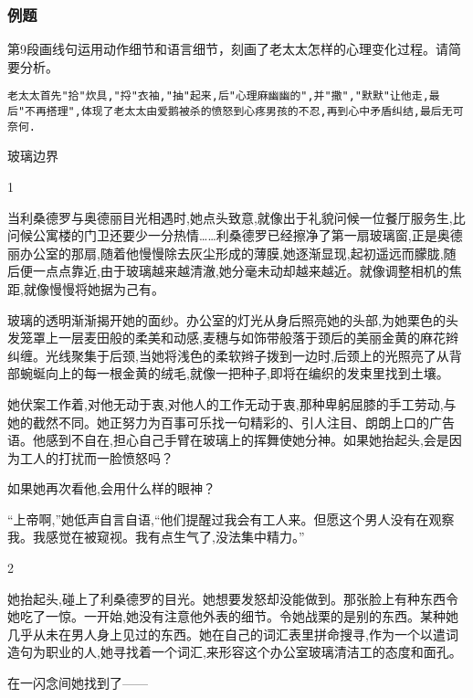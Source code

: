 \documentclass{ctexart}
\newcommand{\nm}{\normalsize}
\renewcommand{\\}{\par}
\begin{document}
\subsubsection{例题}
\\第9段画线句运用动作细节和语言细节，刻画了老太太怎样的心理变化过程。请简要分析。
\\ \texttt{老太太首先"拾"炊具,"捋"衣袖,"抽"起来,后"心理麻幽幽的",并"撒","默默"让他走,最后"不再搭理",体现了老太太由爱鹅被杀的愤怒到心疼男孩的不忍,再到心中矛盾纠结,最后无可奈何.}
\nm \fangsong 
\\\centerline{玻璃边界}
\\ \begin{center} 1 \end{center} \\当利桑德罗与奥德丽目光相遇时,她点头致意,就像出于礼貌问候一位餐厅服务生,比问候公寓楼的门卫还要少一分热情……利桑德罗已经擦净了第一扇玻璃窗,正是奥德丽办公室的那扇,随着他慢慢除去灰尘形成的薄膜,她逐渐显现,起初遥远而朦胧,随后便一点点靠近,由于玻璃越来越清澈,她分毫未动却越来越近。就像调整相机的焦距,就像慢慢将她据为己有。\\玻璃的透明渐渐揭开她的面纱。办公室的灯光从身后照亮她的头部,为她栗色的头发笼罩上一层麦田般的柔美和动感,麦穗与如饰带般落于颈后的美丽金黄的麻花辫纠缠。光线聚集于后颈,当她将浅色的柔软辫子拨到一边时,后颈上的光照亮了从背部蜿蜒向上的每一根金黄的绒毛,就像一把种子,即将在编织的发束里找到土壤。 \\她伏案工作着,对他无动于衷,对他人的工作无动于衷,那种卑躬屈膝的手工劳动,与她的截然不同。她正努力为百事可乐找一句精彩的、引人注目、朗朗上口的广告语。他感到不自在,担心自己手臂在玻璃上的挥舞使她分神。如果她抬起头,会是因为工人的打扰而一脸愤怒吗？ \\如果她再次看他,会用什么样的眼神？ \\``上帝啊,''她低声自言自语,``他们提醒过我会有工人来。但愿这个男人没有在观察我。我感觉在被窥视。我有点生气了,没法集中精力。'' \\ \begin{center} 2 \end{center} \\她抬起头,碰上了利桑德罗的目光。她想要发怒却没能做到。那张脸上有种东西令她吃了一惊。一开始,她没有注意他外表的细节。令她战栗的是别的东西。某种她几乎从未在男人身上见过的东西。她在自己的词汇表里拼命搜寻,作为一个以遣词造句为职业的人,她寻找着一个词汇,来形容这个办公室玻璃清洁工的态度和面孔。\\在一闪念间她找到了——
\end{document}
